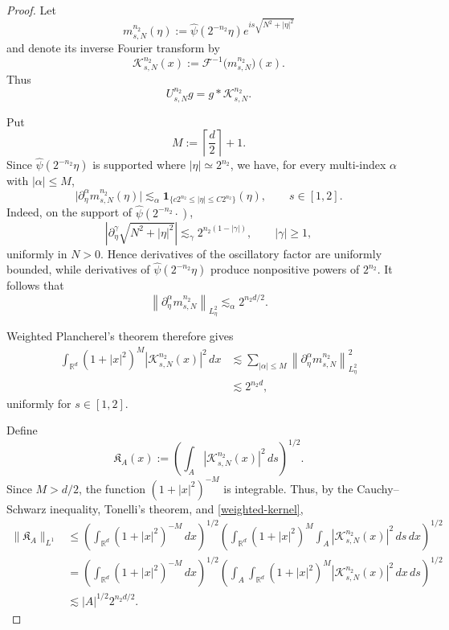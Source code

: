 \documentclass[10pt,a4paper]{amsart}
\begin{document}
	\begin{proof}
		Let
		\[
		m_{s,N}^{n_2}(\eta)
		:=
		\widehat\psi(2^{-n_2}\eta)
		e^{is\sqrt{N^2+|\eta|^2}}
		\]
		and denote its inverse Fourier transform by
		\[
		\mathcal K_{s,N}^{n_2}(x)
		:=
		\mathcal F^{-1}\bigl(m_{s,N}^{n_2}\bigr)(x).
		\]
		Thus
		\[
		U_{s,N}^{n_2}g
		=
		g*\mathcal K_{s,N}^{n_2}.
		\]
		
		Put
		\[
		M:=\left\lceil\frac d2\right\rceil+1.
		\]
		Since \(\widehat\psi(2^{-n_2}\eta)\) is supported where
		\(|\eta|\simeq 2^{n_2}\), we have, for every multi-index
		\(\alpha\) with \(|\alpha|\leq M\),
		\[
		\bigl|
		\partial_\eta^\alpha m_{s,N}^{n_2}(\eta)
		\bigr|
		\lesssim_\alpha
		\mathbf 1_{\{c2^{n_2}\leq|\eta|\leq C2^{n_2}\}}(\eta),
		\qquad s\in[1,2].
		\]
		Indeed, on the support of \(\widehat\psi(2^{-n_2}\cdot)\),
		\[
		\left|
		\partial_\eta^\gamma
		\sqrt{N^2+|\eta|^2}
		\right|
		\lesssim_\gamma
		2^{n_2(1-|\gamma|)},
		\qquad |\gamma|\geq1,
		\]
		uniformly in \(N>0\). Hence derivatives of the oscillatory
		factor are uniformly bounded, while derivatives of
		\(\widehat\psi(2^{-n_2}\eta)\) produce nonpositive powers of
		\(2^{n_2}\). It follows that
		\[
		\left\|
		\partial_\eta^\alpha m_{s,N}^{n_2}
		\right\|_{L^2_\eta}
		\lesssim_\alpha
		2^{n_2d/2}.
		\]
		
		Weighted Plancherel's theorem therefore gives
		\begin{align}
			\int_{\mathbb R^d}
			(1+|x|^2)^M
			|\mathcal K_{s,N}^{n_2}(x)|^2\,dx
			&\lesssim
			\sum_{|\alpha|\leq M}
			\left\|
			\partial_\eta^\alpha m_{s,N}^{n_2}
			\right\|_{L^2_\eta}^2
			\nonumber\\
			&\lesssim
			2^{n_2d},
			\label{weighted-kernel}
		\end{align}
		uniformly for \(s\in[1,2]\).
		
		Define
		\[
		\mathfrak K_A(x)
		:=
		\left(
		\int_A
		|\mathcal K_{s,N}^{n_2}(x)|^2\,ds
		\right)^{1/2}.
		\]
		Since \(M>d/2\), the function \((1+|x|^2)^{-M}\) is
		integrable. Thus, by the Cauchy--Schwarz inequality,
		Tonelli's theorem, and \eqref{weighted-kernel},
		\begin{align*}
			\|\mathfrak K_A\|_{L^1}
			&\leq
			\left(
			\int_{\mathbb R^d}(1+|x|^2)^{-M}\,dx
			\right)^{1/2}
			\left(
			\int_{\mathbb R^d}
			(1+|x|^2)^M
			\int_A
			|\mathcal K_{s,N}^{n_2}(x)|^2\,ds\,dx
			\right)^{1/2}
			\\
			&=
			\left(
			\int_{\mathbb R^d}(1+|x|^2)^{-M}\,dx
			\right)^{1/2}
			\left(
			\int_A
			\int_{\mathbb R^d}
			(1+|x|^2)^M
			|\mathcal K_{s,N}^{n_2}(x)|^2\,dx\,ds
			\right)^{1/2}
			\\
			&\lesssim
			|A|^{1/2}2^{n_2d/2}.
		\end{align*}
		

\end{proof}
\end{document}
